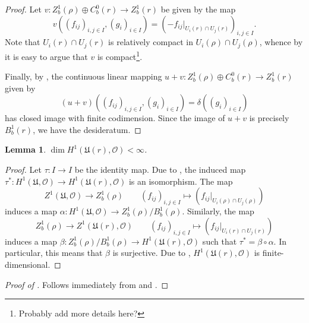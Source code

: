 \documentclass[10pt]{article}
\theoremstyle{thmstyle}
\newtheorem{lemma}[theorem]{Lemma}
\theoremstyle{defstyle}
\newcommand{\frakU}{\mathfrak{U}}
\newcommand{\scrO}{\mathscr{O}} %
\begin{document}
\begin{proof}
    Let $v: Z^1_b(\rho)\oplus C^0_b(r)\to Z^1_b(r)$ be given by the map 
    \begin{equation*}
        v\left((f_{ij})_{i,j\in I}, (g_i)_{i\in I}\right) = \left(-f_{ij}|_{U_i(r)\cap U_j(r)}\right)_{i,j\in I}.
    \end{equation*}
    Note that $U_i(r)\cap U_j(r)$ is relatively compact in $U_i(\rho)\cap U_j(\rho)$, whence by  it is easy to argue that $v$ is compact\footnote{Probably add more details here?}. 

    Finally, by , the continuous linear mapping $u + v : Z^1_b(\rho)\oplus C^0_b(r)\to Z^1_b(r)$ given by 
    \begin{equation*}
        (u + v)\left((f_{ij})_{i,j\in I}, (g_i)_{i\in I}\right) = \delta\left((g_i)_{i\in I}\right)
    \end{equation*}
    has closed image with finite codimension. Since the image of $u + v$ is precisely $B^1_b(r)$, we have the desideratum.
\end{proof}

\begin{lemma}
    $\dim H^1\left(\frakU(r),\scrO\right) < \infty$.
\end{lemma}
\begin{proof}
    Let $\tau: I\to I$ be the identity map. Due to , the induced map $\tau^\ast: H^1(\frakU,\scrO)\to H^1(\frakU(r),\scrO)$ is an isomorphism. The map 
    \begin{equation*}
        Z^1(\frakU,\scrO)\to Z^1_b(\rho)\qquad (f_{ij})_{i,j\in I}\longmapsto \left(f_{ij}|_{U_i(\rho)\cap U_j(\rho)}\right)
    \end{equation*}
    induces a map $\alpha: H^1(\frakU,\scrO)\to Z^1_b(\rho)/B^1_b(\rho)$. Similarly, the map 
    \begin{equation*}
        Z^1_b(\rho)\to Z^1(\frakU(r),\scrO)\qquad (f_{ij})_{i,j\in I}\longmapsto \left(f_{ij}|_{U_i(r)\cap U_j(r)}\right)
    \end{equation*}
    induces a map $\beta: Z^1_b(\rho)/B^1_b(\rho)\to H^1(\frakU(r),\scrO)$ such that $\tau^\ast = \beta\circ\alpha$. In particular, this means that $\beta$ is surjective. Due to , $H^1(\frakU(r),\scrO)$ is finite-dimensional.
\end{proof}

\begin{proof}[Proof of ]
    Follows immediately from  and .
\end{proof}



\end{document}
